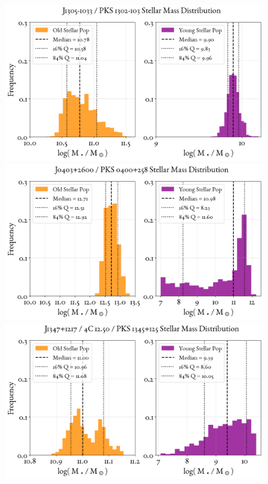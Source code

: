 \begin{figure}
    \centering
    \includegraphics[width=0.8\linewidth]{figures/ResultMasses/117_MassDistri_6001.png}\\
    \includegraphics[width=0.8\linewidth]{figures/ResultMasses/118_MassDistri_6600.png}\\
    \includegraphics[width=0.8\linewidth]{figures/ResultMasses/119_MassDistri_8810.png}    
\end{figure}



